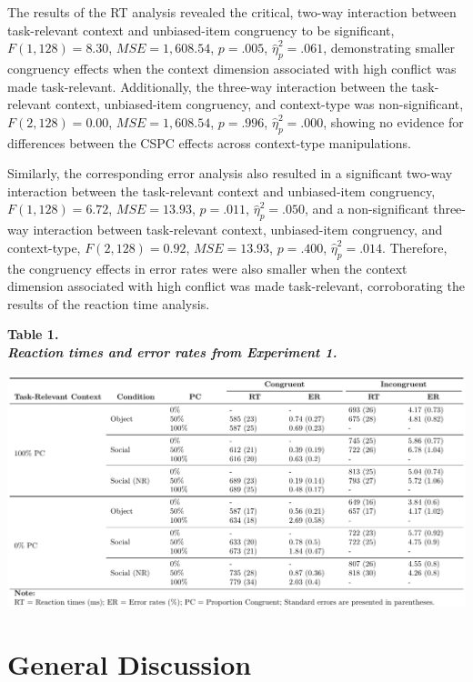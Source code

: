 \documentclass[english,,man,floatsintext]{apa6}
\begin{document}
The results of the RT analysis revealed the critical, two-way interaction between task-relevant context and unbiased-item congruency to be significant, \(F(1, 128) = 8.30\), \(\mathit{MSE} = 1,608.54\), \(p = .005\), \(\hat{\eta}^2_p = .061\), demonstrating smaller congruency effects when the context dimension associated with high conflict was made task-relevant. Additionally, the three-way interaction between the task-relevant context, unbiased-item congruency, and context-type was non-significant, \(F(2, 128) = 0.00\), \(\mathit{MSE} = 1,608.54\), \(p = .996\), \(\hat{\eta}^2_p = .000\), showing no evidence for differences between the CSPC effects across context-type manipulations.

Similarly, the corresponding error analysis also resulted in a significant two-way interaction between the task-relevant context and unbiased-item congruency, \(F(1, 128) = 6.72\), \(\mathit{MSE} = 13.93\), \(p = .011\), \(\hat{\eta}^2_p = .050\), and a non-significant three-way interaction between task-relevant context, unbiased-item congruency, and context-type, \(F(2, 128) = 0.92\), \(\mathit{MSE} = 13.93\), \(p = .400\), \(\hat{\eta}^2_p = .014\). Therefore, the congruency effects in error rates were also smaller when the context dimension associated with high conflict was made task-relevant, corroborating the results of the reaction time analysis.

\begingroup
\setlength{\parindent}{0in}
\vspace{2.5mm}

\textbf{Table 1. \\ \textit{Reaction times and error rates from Experiment 1.}}

\includegraphics{images/table1.pdf}
\endgroup

\hypertarget{general-discussion}{%
\section{General Discussion}\label{general-discussion}}
\end{document}
